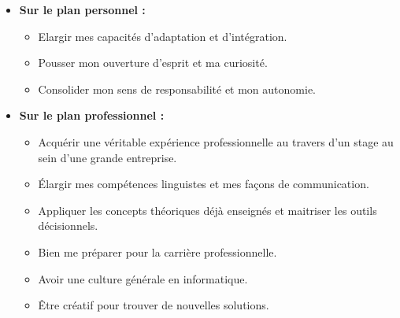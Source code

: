 \begin{itemize}
	\item \textbf{Sur le plan personnel :} 
	     \begin{itemize}
	      \item Elargir mes capacités d’adaptation et d’intégration. 
	      \item Pousser mon ouverture d’esprit et ma curiosité.
	      \item Consolider mon sens de responsabilité et mon autonomie.
	     \end{itemize}
	     
    \item \textbf{Sur le plan professionnel :} 
	     \begin{itemize}
	      \item Acquérir une véritable expérience professionnelle au travers d’un stage au sein d’une grande entreprise. 
	      \item Élargir mes compétences linguistes et mes façons de communication.
	      \item Appliquer les concepts théoriques déjà enseignés et maitriser les outils décisionnels.
	      \item Bien me préparer pour la carrière professionnelle.
	      \item Avoir une culture générale en informatique.
	      \item Être créatif pour trouver de nouvelles solutions.
	     \end{itemize}
\end{itemize}
